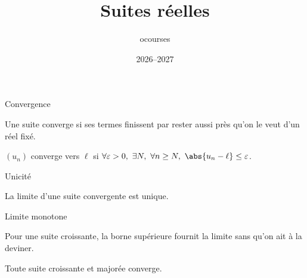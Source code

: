 \documentclass[9pt,t]{beamer}
\title{Suites réelles}
\author{ocourses}
\date{2026--2027}
\begin{document}
\slidetitlepage

\begin{slide}{Convergence}

Une suite converge si ses termes finissent par rester aussi près qu'on le
veut d'un réel fixé.

\begin{definition}[title=Suite convergente]
    $(u_n)$ converge vers $\ell$ si
    $\forall \varepsilon > 0,\ \exists N,\ \forall n \ge N,\ \abs{u_n - \ell} \le \varepsilon$.
\end{definition}

\end{slide}

\begin{slide}{Unicité}

\begin{theorem}[title=Unicité]
    La limite d'une suite convergente est unique.
\end{theorem}

\end{slide}

\begin{slide}{Limite monotone}

Pour une suite croissante, la borne supérieure fournit la limite sans
qu'on ait à la deviner.

\begin{theorem}[title=Limite monotone]
    Toute suite croissante et majorée converge.
\end{theorem}

\end{slide}
\end{document}
